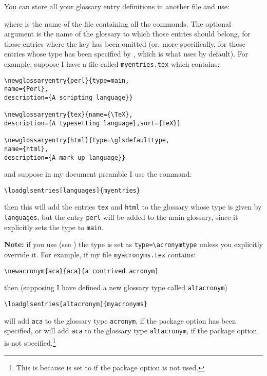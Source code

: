 \documentclass[report]{nlctdoc}
\newcommand*{\gloskey}[2][newglossaryentry]{\csopt{#1}{#2}}
\begin{document}
You can store all your glossary entry definitions in another
file and use:
\begin{definition}[\DescribeMacro{\loadglsentries}]
\end{definition}
where  is the name of the file containing all the
 commands. The optional argument
 is the name of the glossary to which those entries
should belong, for those entries where the \gloskey{type} key has 
been omitted (or, more specifically, for those entries whose
type has been specified by , which is what
 uses by default). For example, suppose I have
a file called \texttt{myentries.tex} which contains:
\begin{verbatim}
\newglossaryentry{perl}{type=main,
name={Perl},
description={A scripting language}}

\newglossaryentry{tex}{name={\TeX},
description={A typesetting language},sort={TeX}}

\newglossaryentry{html}{type=\glsdefaulttype,
name={html},
description={A mark up language}}
\end{verbatim}
and suppose in my document preamble I use the command:
\begin{verbatim}
\loadglsentries[languages]{myentries}
\end{verbatim}
then this will add the entries \texttt{tex} and \texttt{html}
to the glossary whose type is given by \texttt{languages}, but
the entry \texttt{perl} will be added to the main glossary, since
it explicitly sets the type to \texttt{main}.

\textbf{Note:} if you use  (see
) the type is set as
\verb|type=\acronymtype| unless you explicitly override it. For
example, if my file \texttt{myacronyms.tex} contains:
\begin{verbatim}
\newacronym{aca}{aca}{a contrived acronym}
\end{verbatim}
then (supposing I have defined a new glossary type called
\texttt{altacronym})
\begin{verbatim}
\loadglsentries[altacronym]{myacronyms}
\end{verbatim}
will add \texttt{aca} to the glossary type \texttt{acronym}, if the
package option  has been specified, or will add
\texttt{aca} to the glossary type \texttt{altacronym}, if the
package option  is not specified.\footnote{This is
because  is set to  if the
 package option is not used.}
\end{document}

